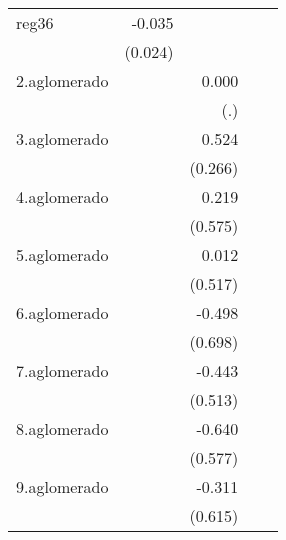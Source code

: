{\begin{longtable}{l*{4}{D{.}{.}{-1}}}
\addlinespace
reg36       &      -0.035         &                     &                     &                     \\
            &     (0.024)         &                     &                     &                     \\
\addlinespace
2.aglomerado&                     &       0.000         &                     &                     \\
            &                     &         (.)         &                     &                     \\
\addlinespace
3.aglomerado&                     &       0.524\sym{*}  &                     &                     \\
            &                     &     (0.266)         &                     &                     \\
\addlinespace
4.aglomerado&                     &       0.219         &                     &                     \\
            &                     &     (0.575)         &                     &                     \\
\addlinespace
5.aglomerado&                     &       0.012         &                     &                     \\
            &                     &     (0.517)         &                     &                     \\
\addlinespace
6.aglomerado&                     &      -0.498         &                     &                     \\
            &                     &     (0.698)         &                     &                     \\
\addlinespace
7.aglomerado&                     &      -0.443         &                     &                     \\
            &                     &     (0.513)         &                     &                     \\
\addlinespace
8.aglomerado&                     &      -0.640         &                     &                     \\
            &                     &     (0.577)         &                     &                     \\
\addlinespace
9.aglomerado&                     &      -0.311         &                     &                     \\
            &                     &     (0.615)         &                     &                     \\

\end{longtable}}
